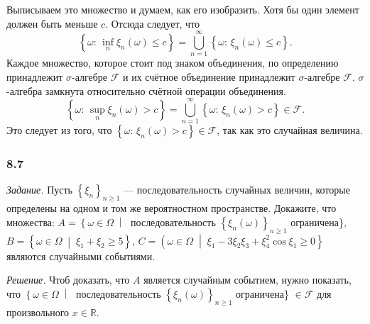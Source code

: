 Выписываем это множество и думаем, как его изобразить.
Хотя бы один элемент должен быть меньше $c$.
Отсюда следует, что
$$ \left\{ \omega: \,
\inf \limits_{n} \xi_n \left( \omega \right) \leq
c \right\} =
\bigcup \limits_{n=1}^{ \infty } \left\{ \omega: \,
\xi_n \left( \omega \right) \leq
c \right\}.$$
Каждое множество,
которое стоит под знаком объединения, по определению принадлежит $ \sigma $-алгебре $ \mathcal{F} $ и их счётное объединение принадлежит $ \sigma $-алгебре $ \mathcal{F} $.
$ \sigma $-алгебра замкнута относительно счётной операции объединения.
$$ \left\{ \omega: \,
\sup \limits_{n} \xi_n \left( \omega \right) >
c \right\} =
\bigcup \limits_{n=1}^{ \infty } \left\{ \omega: \,
\xi_n \left( \omega \right) > c \right\} \in
\mathcal{F}.$$
Это следует из того, что $\left\{ \omega: \, \xi_n \left( \omega \right) > c \right\} \in \mathcal{F} $, так как это случайная величина.

\subsubsection*{8.7}

\textit{Задание.} Пусть $ \left\{ \xi_n \right\}_{n \geq 1}$ --- последовательность случайных величин, которые определены на одном и том же вероятностном пространстве.
Докажите, что множества: $A = \left\{ \omega \in \Omega \; \middle| \; \right.$ последовательность $ \left\{ \xi_n \left( \omega \right) \right\}_{n \geq 1}$ ограничена\},
$B =
\left\{ \omega \in \Omega \; \middle| \; \xi_1 + \xi_2 \geq 5 \right\}, \,
C =
\left( \omega \in \Omega \; \middle| \; \xi_1 -3 \xi_2 \xi_3 + \xi_4^2 \cos \xi_1 \geq 0 \right\} $
являются случайными событиями.

\textit{Решение.} Чтоб доказать, что $A$ является случайным событием, нужно показать, что $ \left\{ \omega \in \Omega \; \middle| \; \right. $ последовательность $ \left\{ \xi_n \left( \omega \right) \right\}_{n \geq 1}$ ограничена\} $ \in \mathcal{F} $ для произвольного $x \in \mathbb{R} $.

